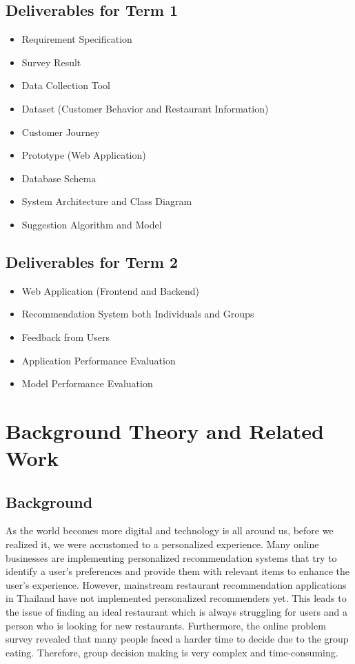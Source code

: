 \documentclass[12pt,oneside,openright,a4paper]{cpe-english-project}
\begin{document}
\newpage

\section{Deliverables for Term 1} 
\begin{itemize}
\item Requirement Specification
\item Survey Result
\item Data Collection Tool
\item Dataset (Customer Behavior and Restaurant Information)
\item Customer Journey
\item Prototype (Web Application)
\item Database Schema
\item System Architecture and Class Diagram
\item Suggestion Algorithm and Model
\end{itemize}

\section{Deliverables for Term 2} 
\begin{itemize}
\item Web Application (Frontend and Backend)
\item Recommendation System both Individuals and Groups
\item Feedback from Users
\item Application Performance Evaluation
\item Model Performance Evaluation
\end{itemize}


\chapter{Background Theory and Related Work}

\section{Background}

As the world becomes more digital and technology is all around us, before we realized it, we were accustomed to a personalized experience. Many online businesses are implementing personalized recommendation systems that try to identify a user’s preferences and provide them with relevant items to enhance the user's experience. However, mainstream restaurant recommendation applications in Thailand have not implemented personalized recommenders yet. This leads to the issue of finding an ideal restaurant which is always struggling for users and a person who is looking for new restaurants. Furthermore, the online problem survey revealed that many people faced a harder time to decide due to the group eating. Therefore, group decision making is very complex and time-consuming.
\end{document}
